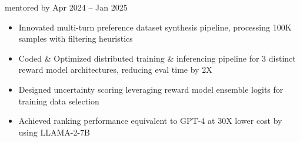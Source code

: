     {{\bodyfontsize \color{body} mentored by} }
    {Apr 2024 -- Jan 2025}{}{}
\begin{itemize}

    \item Innovated multi-turn preference dataset synthesis pipeline, processing 100K samples with filtering heuristics


    \item Coded \& Optimized distributed training \& inferencing pipeline for 3 distinct reward model architectures, reducing eval time by 2X

    \item Designed uncertainty scoring leveraging reward model ensemble logits for training data selection

    \item Achieved ranking performance equivalent to GPT-4 at 30X lower cost by using LLAMA-2-7B
\end{itemize}
\dividerSmall


